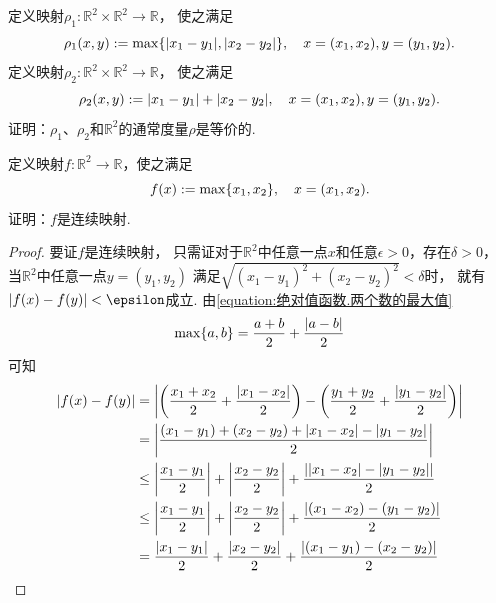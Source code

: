 \begin{example}
定义映射\(\rho_1\colon \mathbb{R}^2 \times \mathbb{R}^2 \to \mathbb{R}\)，
使之满足\begin{equation*}
	\rho_1(x,y) := \max\{ \abs{x_1-y_1}, \abs{x_2-y_2} \},
	\quad x=(x_1,x_2),y=(y_1,y_2).
\end{equation*}
定义映射\(\rho_2\colon \mathbb{R}^2 \times \mathbb{R}^2 \to \mathbb{R}\)，
使之满足\begin{equation*}
	\rho_2(x,y) := \abs{x_1-y_1} + \abs{x_2-y_2},
	\quad x=(x_1,x_2),y=(y_1,y_2).
\end{equation*}
证明：\(\rho_1\)、\(\rho_2\)和\(\mathbb{R}^2\)的通常度量\(\rho\)是等价的.
\end{example}

\begin{example}
定义映射\(f\colon \mathbb{R}^2 \to \mathbb{R}\)，使之满足\begin{equation*}
	f(x) := \max\{ x_1, x_2 \},
	\quad x=(x_1,x_2).
\end{equation*}
证明：\(f\)是连续映射.
\begin{proof}
要证\(f\)是连续映射，
只需证对于\(\mathbb{R}^2\)中任意一点\(x\)和任意\(\epsilon > 0\)，存在\(\delta > 0\)，
当\(\mathbb{R}^2\)中任意一点\(y = (y_1,y_2)\)
满足\(\sqrt{(x_1-y_1)^2+(x_2-y_2)^2} < \delta\)时，
就有\(\abs{f(x) - f(y)} < \epsilon\)成立.
由\cref{equation:绝对值函数.两个数的最大值} \begin{equation*}
	\max\{a,b\} = \frac{a+b}{2} + \frac{\abs{a-b}}{2}
\end{equation*}
\def\ExpandMax#1#2{\frac{#1+#2}{2} + \frac{\abs{#1-#2}}{2}}
可知\begin{align*}
	\abs{f(x) - f(y)}
	&= \abs{
		\left( \ExpandMax{x_1}{x_2} \right)
		-
		\left( \ExpandMax{y_1}{y_2} \right)
	} \\
	&= \abs{
		\frac{
			(x_1-y_1) + (x_2-y_2)
			+ \abs{x_1-x_2} - \abs{y_1-y_2}
		}{2}
	} \\
	&\leq \abs{\frac{x_1-y_1}{2}} + \abs{\frac{x_2-y_2}{2}} + \frac{\abs{\abs{x_1-x_2} - \abs{y_1-y_2}}}{2} \\
	&\leq \abs{\frac{x_1-y_1}{2}} + \abs{\frac{x_2-y_2}{2}} + \frac{\abs{(x_1-x_2)-(y_1-y_2)}}{2} \\
	&= \frac{\abs{x_1-y_1}}{2} + \frac{\abs{x_2-y_2}}{2} + \frac{\abs{(x_1-y_1)-(x_2-y_2)}}{2} \\

\end{align*}
\end{proof}
\end{example}
